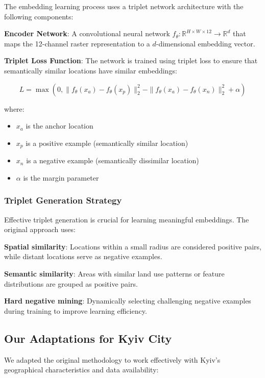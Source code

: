 The embedding learning process uses a triplet network architecture with the following components:

\textbf{Encoder Network}: A convolutional neural network $f_\theta: \mathbb{R}^{H \times W \times 12} \rightarrow \mathbb{R}^d$ that maps the 12-channel raster representation to a $d$-dimensional embedding vector.

\textbf{Triplet Loss Function}: The network is trained using triplet loss to ensure that semantically similar locations have similar embeddings:

\begin{equation}
L = \max(0, \|f_\theta(x_a) - f_\theta(x_p)\|_2^2 - \|f_\theta(x_a) - f_\theta(x_n)\|_2^2 + \alpha)
\end{equation}

where:
\begin{itemize}
    \item $x_a$ is the anchor location
    \item $x_p$ is a positive example (semantically similar location)
    \item $x_n$ is a negative example (semantically dissimilar location)
    \item $\alpha$ is the margin parameter
\end{itemize}

\subsubsection{Triplet Generation Strategy}

Effective triplet generation is crucial for learning meaningful embeddings. The original approach uses:

\textbf{Spatial similarity}: Locations within a small radius are considered positive pairs, while distant locations serve as negative examples.

\textbf{Semantic similarity}: Areas with similar land use patterns or feature distributions are grouped as positive pairs.

\textbf{Hard negative mining}: Dynamically selecting challenging negative examples during training to improve learning efficiency.

\subsection{Our Adaptations for Kyiv City}

We adapted the original methodology to work effectively with Kyiv's geographical characteristics and data availability:

